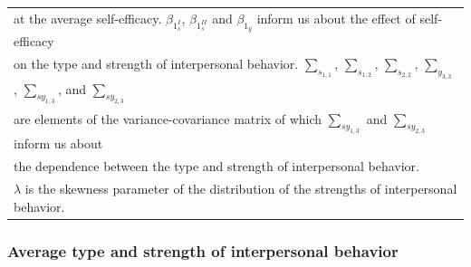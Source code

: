 \documentclass[man]{apa6}
\begin{document}
\begin{table}
\begin{tabular}[t]{lllllll}
\multicolumn{7}{l}{at the average self-efficacy. $\beta_{1_s^{I}}$, $\beta_{1_s^{II}}$ and $\beta_{1_y}$ inform us about the effect of self-efficacy }\\
\multicolumn{7}{l}{on the type and strength of interpersonal behavior. $\sum_{s_{1,1}}$, $\sum_{s_{1,2}}$, $\sum_{s_{2,2}}$, $\sum_{y_{3,3}}$, $\sum_{sy_{1,3}}$,  and $\sum_{sy_{2,3}}$ }\\
\multicolumn{7}{l}{are elements of the variance-covariance matrix of which $\sum_{sy_{1,3}}$ and $\sum_{sy_{2,3}}$ inform us about}\\
\multicolumn{7}{l}{the dependence between the type and strength of interpersonal behavior.}\\
\multicolumn{7}{l}{$\lambda$ is the skewness parameter of the distribution of the strengths of interpersonal behavior.}\\
\end{tabular}
\end{table}

\subsubsection{Average type and strength of interpersonal behavior}
\end{document}
